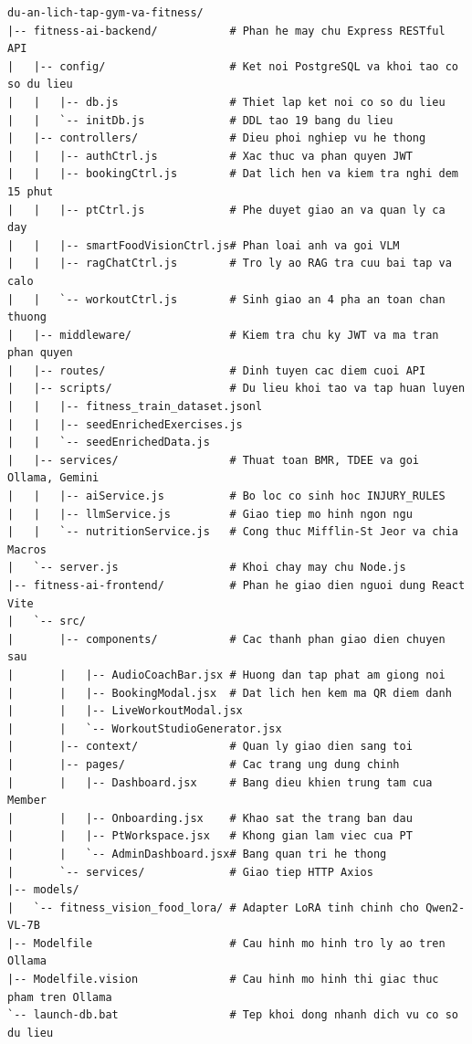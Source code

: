 \begin{lstlisting}[language={}, caption={Sơ đồ cấu trúc cây thư mục toàn bộ dự án Fitness AI}, label={lst:project_tree}]
du-an-lich-tap-gym-va-fitness/
|-- fitness-ai-backend/           # Phan he may chu Express RESTful API
|   |-- config/                   # Ket noi PostgreSQL va khoi tao co so du lieu
|   |   |-- db.js                 # Thiet lap ket noi co so du lieu
|   |   `-- initDb.js             # DDL tao 19 bang du lieu
|   |-- controllers/              # Dieu phoi nghiep vu he thong
|   |   |-- authCtrl.js           # Xac thuc va phan quyen JWT
|   |   |-- bookingCtrl.js        # Dat lich hen va kiem tra nghi dem 15 phut
|   |   |-- ptCtrl.js             # Phe duyet giao an va quan ly ca day
|   |   |-- smartFoodVisionCtrl.js# Phan loai anh va goi VLM
|   |   |-- ragChatCtrl.js        # Tro ly ao RAG tra cuu bai tap va calo
|   |   `-- workoutCtrl.js        # Sinh giao an 4 pha an toan chan thuong
|   |-- middleware/               # Kiem tra chu ky JWT va ma tran phan quyen
|   |-- routes/                   # Dinh tuyen cac diem cuoi API
|   |-- scripts/                  # Du lieu khoi tao va tap huan luyen
|   |   |-- fitness_train_dataset.jsonl
|   |   |-- seedEnrichedExercises.js
|   |   `-- seedEnrichedData.js
|   |-- services/                 # Thuat toan BMR, TDEE va goi Ollama, Gemini
|   |   |-- aiService.js          # Bo loc co sinh hoc INJURY_RULES
|   |   |-- llmService.js         # Giao tiep mo hinh ngon ngu
|   |   `-- nutritionService.js   # Cong thuc Mifflin-St Jeor va chia Macros
|   `-- server.js                 # Khoi chay may chu Node.js
|-- fitness-ai-frontend/          # Phan he giao dien nguoi dung React Vite
|   `-- src/
|       |-- components/           # Cac thanh phan giao dien chuyen sau
|       |   |-- AudioCoachBar.jsx # Huong dan tap phat am giong noi
|       |   |-- BookingModal.jsx  # Dat lich hen kem ma QR diem danh
|       |   |-- LiveWorkoutModal.jsx
|       |   `-- WorkoutStudioGenerator.jsx
|       |-- context/              # Quan ly giao dien sang toi
|       |-- pages/                # Cac trang ung dung chinh
|       |   |-- Dashboard.jsx     # Bang dieu khien trung tam cua Member
|       |   |-- Onboarding.jsx    # Khao sat the trang ban dau
|       |   |-- PtWorkspace.jsx   # Khong gian lam viec cua PT
|       |   `-- AdminDashboard.jsx# Bang quan tri he thong
|       `-- services/             # Giao tiep HTTP Axios
|-- models/
|   `-- fitness_vision_food_lora/ # Adapter LoRA tinh chinh cho Qwen2-VL-7B
|-- Modelfile                     # Cau hinh mo hinh tro ly ao tren Ollama
|-- Modelfile.vision              # Cau hinh mo hinh thi giac thuc pham tren Ollama
`-- launch-db.bat                 # Tep khoi dong nhanh dich vu co so du lieu
\end{lstlisting}
